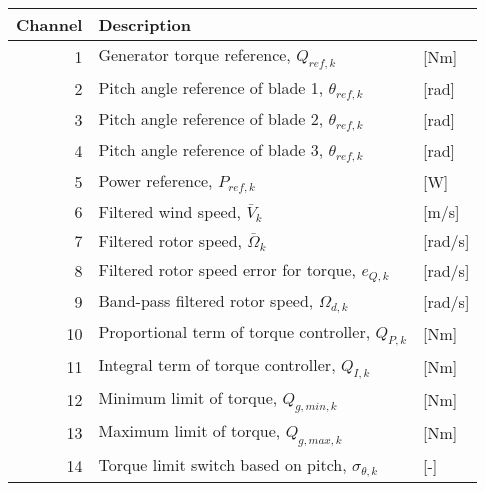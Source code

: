 \begin{table}[t]
\center
\begin{tabular}{r|ll}
Channel & Description \\ \hline                                     
 1& Generator torque reference, $Q_{ref,k}$                          &[Nm]\\            %
 2& Pitch angle reference of blade 1, $\theta_{ref,k}$               &[rad]\\           %
 3& Pitch angle reference of blade 2, $\theta_{ref,k}$               &[rad]\\           %
 4& Pitch angle reference of blade 3, $\theta_{ref,k}$               &[rad]\\           %
 5& Power reference, $P_{ref,k}$                                     &[W]\\             %
 6& Filtered wind speed, $\bar V_k$                                  &[m/s]\\           %
 7& Filtered rotor speed, $\bar \Omega_k$                            &[rad/s]\\         %
 8& Filtered rotor speed error for torque, $e_{Q,k}$                 &[rad/s]\\         %
 9& Band-pass filtered rotor speed, $\Omega_{d,k}$                   &[rad/s]\\         %
10& Proportional term of torque controller, $Q_{P,k}$                &[Nm]\\            %
11& Integral term of torque controller, $Q_{I,k}$                    &[Nm]\\            %
12& Minimum limit of torque, $Q_{g,min,k}$                           &[Nm]\\            %
13& Maximum limit of torque, $Q_{g,max,k}$                           &[Nm]\\            %
14& Torque limit switch based on pitch, $\sigma_{\theta,k}$          &[-]\\             %

\end{tabular}
\end{table}
